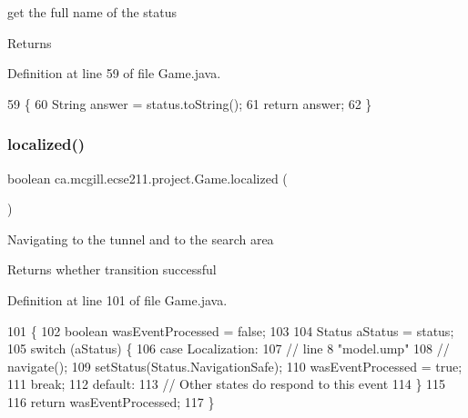 get the full name of the status

\begin{DoxyReturn}{Returns}

\end{DoxyReturn}


Definition at line 59 of file Game.\+java.


\begin{DoxyCode}
59                                     \{
60     String answer = status.toString();
61     \textcolor{keywordflow}{return} answer;
62   \}
\end{DoxyCode}
\mbox{\label{enumca_1_1mcgill_1_1ecse211_1_1project_1_1_game_a6b4c0cfb8de83ba7c6d5dfb24882dc5a}} 
\subsubsection{\texorpdfstring{localized()}{localized()}}
{\footnotesize\ttfamily boolean ca.\+mcgill.\+ecse211.\+project.\+Game.\+localized (\begin{DoxyParamCaption}{ }\end{DoxyParamCaption})}

Navigating to the tunnel and to the search area

\begin{DoxyReturn}{Returns}
whether transition successful 
\end{DoxyReturn}


Definition at line 101 of file Game.\+java.


\begin{DoxyCode}
101                              \{
102     \textcolor{keywordtype}{boolean} wasEventProcessed = \textcolor{keyword}{false};
103 
104     Status aStatus = status;
105     \textcolor{keywordflow}{switch} (aStatus) \{
106       \textcolor{keywordflow}{case} Localization:
107         \textcolor{comment}{// line 8 "model.ump"}
108         \textcolor{comment}{// navigate();}
109         setStatus(Status.NavigationSafe);
110         wasEventProcessed = \textcolor{keyword}{true};
111         \textcolor{keywordflow}{break};
112       \textcolor{keywordflow}{default}:
113         \textcolor{comment}{// Other states do respond to this event}
114     \}
115 
116     \textcolor{keywordflow}{return} wasEventProcessed;
117   \}
\end{DoxyCode}
\mbox{\label{enumca_1_1mcgill_1_1ecse211_1_1project_1_1_game_a5f387482790bf2c55413a6619b4d00d8}} 
